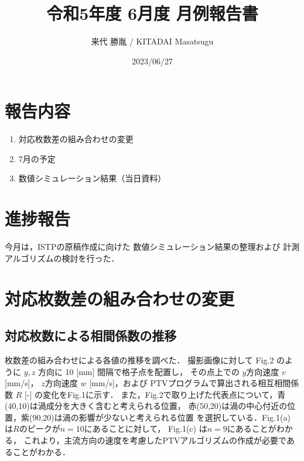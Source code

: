 \documentclass[twocolumn,a4j]{jsarticle}
\author{来代 勝胤 / KITADAI Masatsugu}
\title{令和5年度 6月度 月例報告書}
\date{2023/06/27}
\begin{document}
\columnseprule=0.1mm
\maketitle

\section*{報告内容}
\begin{enumerate}[1.]
  \item 対応枚数差の組み合わせの変更
  \item 7月の予定
  \item 数値シミュレーション結果（当日資料）
\end{enumerate}

\section*{進捗報告}
今月は，ISTPの原稿作成に向けた
数値シミュレーション結果の整理および
計測アルゴリズムの検討を行った．

\section{対応枚数差の組み合わせの変更}
\subsection{対応枚数による相間係数の推移}
枚数差の組み合わせによる各値の推移を調べた．
撮影画像に対して Fig.2 のように $y,z$ 方向に 10 [mm] 間隔で格子点を配置し，
その点上での $y$方向速度 $v$ [mm/s]， $z$方向速度 $w$ [mm/s]，および
PTVプログラムで算出される相互相間係数 $R$ [-] の変化をFig.1に示す．
また，Fig.2で取り上げた代表点について，青(40,10)は渦成分を大きく含むと考えられる位置，
赤(50,20)は渦の中心付近の位置，紫(90,20)は渦の影響が少ないと考えられる位置
を選択している．Fig.1(a) は$R$のピークが$n=10$にあることに対して，
Fig.1(c) は$n=9$にあることがわかる，
これより，主流方向の速度を考慮したPTVアルゴリズムの作成が必要であることがわかる．\\
\end{document}
